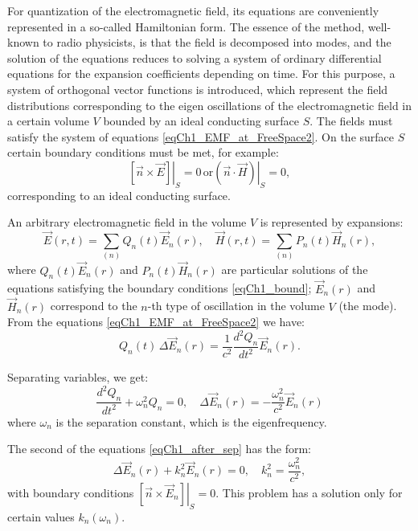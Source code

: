 For quantization of the electromagnetic field, its equations are conveniently
represented in a so-called Hamiltonian form. The essence of the method, well-known
to radio physicists, is that the field is decomposed into
modes, and the solution of the equations reduces to solving a system of ordinary
differential equations for the expansion coefficients depending on time.
For this purpose, a system of orthogonal vector functions is introduced, which represent the field distributions corresponding to the eigen oscillations of the electromagnetic field in a certain volume $V$ bounded by an ideal conducting surface $S$. The fields must satisfy
the system of equations \eqref{eqCh1_EMF_at_FreeSpace2}. On the surface $S$
certain boundary conditions must be met, for example: 
\begin{equation}
\left. \left[ \vec{n} \times \vec{E} \right] \right|_S = 0 \,
\mbox{or}
\left. \left( \vec{n} \cdot \vec{H} \right) \right|_S = 0,
\label{eqCh1_bound}
\end{equation}
corresponding to an ideal conducting surface.

An arbitrary electromagnetic field in the volume $V$ is represented by expansions:
\begin{equation}
\vec{E}\left(r, t\right) = \sum_{(n)} Q_n\left(t\right)\vec{E}_n\left(r\right),
\quad
\vec{H}\left(r, t\right) = \sum_{(n)} P_n\left(t\right)\vec{H}_n\left(r\right),
\label{eqCh1_sep0}
\end{equation}
where $Q_n\left(t\right)\vec{E}_n\left(r\right)$ and 
$P_n\left(t\right)\vec{H}_n\left(r\right)$ are particular solutions of the equations satisfying the boundary conditions
\eqref{eqCh1_bound}; $\vec{E}_n\left(r\right)$ and  
$\vec{H}_n\left(r\right)$ correspond to the $n$-th type 
of oscillation in the volume $V$ (the mode).
From the equations \eqref{eqCh1_EMF_at_FreeSpace2} we have:
\begin{equation}
Q_n\left(t\right) \, \Delta \vec{E}_n\left(r\right) = 
\frac{1}{c^2} \frac{d^2 Q_n}{d t^2}\vec{E}_n\left(r\right). 
\end{equation}

Separating variables, we get:
\begin{equation}
\frac{d^2 Q_n}{d t^2} + \omega_n^2 Q_n = 0,
\quad
\Delta \vec{E}_n \left(r\right) = - \frac{\omega_n^2}{c^2} 
\vec{E}_n \left(r\right)
\label{eqCh1_after_sep}
\end{equation}
where $\omega_n$ is the separation constant, which is the eigenfrequency.

The second of the equations \eqref{eqCh1_after_sep} has the form:
\begin{equation}
\Delta \vec{E}_n\left(r\right) + k_n^2 \vec{E}_n\left(r\right) = 0,
\quad
k_n^2 = \frac{\omega_n^2}{c^2},
\end{equation}
with boundary conditions  
$\left. \left[ \vec{n} \times \vec{E}_n \right] \right|_S = 0$. This
problem has a solution only for certain values  
$k_n\left(\omega_n\right)$.

